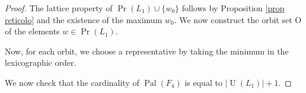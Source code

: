 \documentclass[10pt,a4paper]{amsart}
\DeclareMathOperator{\Pal}{\mathrm{Pal}}
\DeclareMathOperator{\U}{\mathrm{U}}
\begin{document}
\begin{proof}
    The lattice property  of  $\Pr(L_1) \cup \{w_0\}$ follows by Proposition \ref{prop reticolo} and the existence of the maximum $w_0$.
We now construct the orbit set $\mathrm{O}$ of the elements $w\in \Pr(L_1)$.



Now, for each orbit, we choose a representative by taking the minimum in the lexicographic order.


We now check that the cardinality of $\Pal(F_4)$ is equal to $|\U(L_1)|+1$.



\end{proof}
\end{document}
